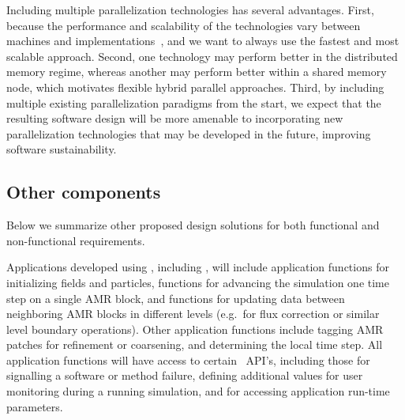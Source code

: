\documentclass[11pt,letterpaper]{article}
\begin{document}
Including multiple
parallelization technologies has several advantages.
%
First, because the performance and
scalability of the technologies vary between machines and
implementations~\cite{MaTa09}, and we want to always use the fastest
and most scalable approach.  
%
Second, one technology may perform better
in the distributed memory regime, whereas another may perform better
within a shared memory node, which motivates flexible hybrid parallel
approaches.  
%
Third, by including multiple existing parallelization
paradigms from the start, we expect that the resulting software design
will be more amenable to incorporating new parallelization
technologies that may be developed in the future, improving software
sustainability.  
%



\subsection{Other components} \label{ss:design-other}

Below we summarize other proposed design solutions for both functional
and non-functional requirements.

%
Applications developed using \cello, including \enzoii, will include
application functions for initializing fields and particles, functions
for advancing the simulation one time step on a single AMR block, and
functions for updating data between neighboring AMR blocks in
different levels (e.g.~for flux correction or similar level boundary operations).
Other application functions include tagging AMR
patches for refinement or coarsening, and determining the local time
step.  All application functions will have access to certain \cello\
API's, including those for signalling a software or method failure,
defining additional values for user monitoring during a running
simulation, and for accessing application run-time parameters.
\end{document}
